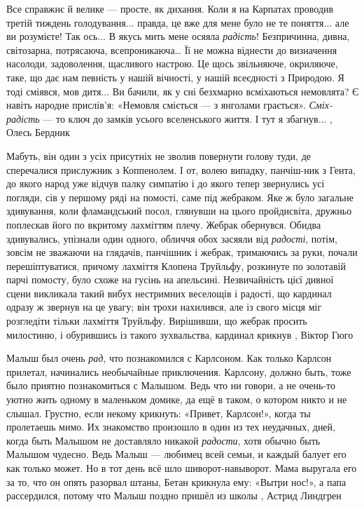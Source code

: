 Все справжнє й велике — просте, як дихання. Коли я на Карпатах проводив третій
тиждень голодування... правда, це вже для мене було не те поняття... але ви
розумієте! Так ось... В якусь мить мене осяяла \emph{радість}! Безпричинна,
дивна, світозарна, потрясаюча, всепроникаюча… Її не можна віднести до
визначення насолоди, задоволення, щасливого настрою. Це щось звільняюче,
окриляюче, таке, що дає нам певність у нашій вічності, у нашій всеєдності з
Природою. Я тоді сміявся, мов дитя... Ви бачили, як у сні безхмарно всміхаються
немовлята? Є навіть народне прислів’я: «Немовля сміється — з янголами
грається».  \emph{Сміх-радість} — то ключ до замків усього вселенського життя.
І тут я збагнув...
, Олесь Бердник

Мабуть, він один з усіх присутніх не зволив повернути голову туди, де
сперечалися прислужник з Коппенолем. І от, волею випадку, панчіш-ник з Гента,
до якого народ уже відчув палку симпатію і до якого тепер звернулись усі
погляди, сів у першому ряді на помості, саме під жебраком. Яке ж було загальне
здивування, коли фламандський посол, глянувши на цього пройдисвіта, дружньо
поплескав його по вкритому лахміттям плечу. Жебрак обернувся. Обидва
здивувались, упізнали один одного, обличчя обох засяяли від \emph{радості}, потім,
зовсім не зважаючи на глядачів, панчішник і жебрак, тримаючись за руки, почали
перешіптуватися, причому лахміття Клопена Труйльфу, розкинуте по золотавій
парчі помосту, було схоже на гусінь на апельсині.
Незвичайність цієї дивної сцени викликала такий вибух нестримних веселощів і
радості, що кардинал одразу ж звернув на це увагу; він трохи нахилився, але із
свого місця міг розгледіти тільки лахміття Труйльфу. Вирішивши, що жебрак
просить милостиню, і обурившись із такого зухвальства, кардинал крикнув
, Віктор Гюго

Малыш был очень \emph{рад}, что познакомился с Карлсоном. Как только Карлсон прилетал,
начинались необычайные приключения. Карлсону, должно быть, тоже было приятно
познакомиться с Малышом. Ведь что ни говори, а не очень-то уютно жить одному в
маленьком домике, да ещё в таком, о котором никто и не слышал. Грустно, если
некому крикнуть: «Привет, Карлсон!», когда ты пролетаешь мимо.
Их знакомство произошло в один из тех неудачных, дней, когда быть Малышом не
доставляло никакой \emph{радости}, хотя обычно быть Малышом чудесно. Ведь Малыш —
любимец всей семьи, и каждый балует его как только может. Но в тот день всё шло
шиворот-навыворот. Мама выругала его за то, что он опять разорвал штаны, Бетан
крикнула ему: «Вытри нос!», а папа рассердился, потому что Малыш поздно пришёл
из школы
, Астрид Линдгрен
